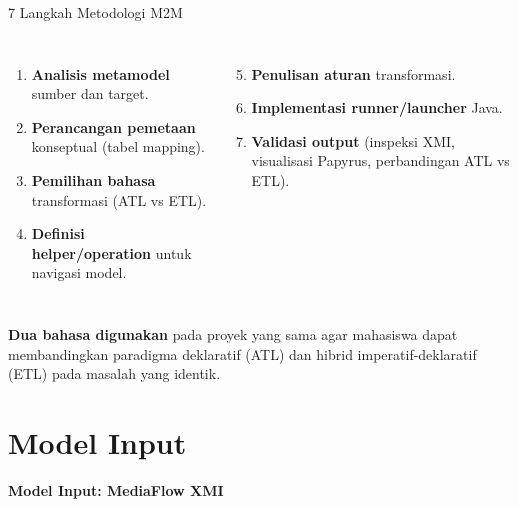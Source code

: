 \documentclass[aspectratio=169, table]{beamer}
\begin{document}
\begin{frame}{7 Langkah Metodologi M2M}
\vspace{4pt}
\begin{columns}[T]
\begin{enumerate}
  \item \textbf{Analisis metamodel} sumber dan target.
  \item \textbf{Perancangan pemetaan} konseptual (tabel mapping).
  \item \textbf{Pemilihan bahasa} transformasi (ATL vs ETL).
  \item \textbf{Definisi helper/operation} untuk navigasi model.
\end{enumerate}

\begin{enumerate}
  \setcounter{enumi}{4}
  \item \textbf{Penulisan aturan} transformasi.
  \item \textbf{Implementasi runner/launcher} Java.
  \item \textbf{Validasi output} (inspeksi XMI, visualisasi Papyrus, perbandingan ATL vs ETL).
\end{enumerate}
\end{columns}

\vspace{10pt}
\small
\textbf{Dua bahasa digunakan} pada proyek yang sama agar mahasiswa dapat membandingkan paradigma deklaratif (ATL) dan hibrid imperatif-deklaratif (ETL) pada masalah yang identik.
\end{frame}

\section{Model Input}
\begin{frame}{\hfill}
	\centering
	\Huge{\textbf{Model Input: MediaFlow XMI}}
\end{frame}
\end{document}
